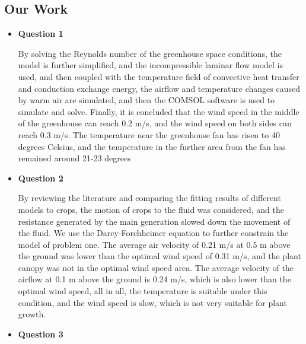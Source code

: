 \documentclass{apmcmthesis}
\begin{document}
\subsection{Our Work}
\begin{itemize}
  \item \textbf{Question 1}

  By solving the Reynolds number of the greenhouse space conditions, the model is further simplified, and the incompressible laminar flow model is used, and then coupled with the temperature field of convective heat transfer and conduction exchange energy, the airflow and temperature changes caused by warm air are simulated, and then the COMSOL software is used to simulate and solve. Finally, it is concluded that the wind speed in the middle of the greenhouse can reach 0.2 m/s, and the wind speed on both sides can reach 0.3 m/s. The temperature near the greenhouse fan has risen to 40 degrees Celsius, and the temperature in the further area from the fan has remained around 21-23 degrees
  \item \textbf{Question 2}
  
   By reviewing the literature and comparing the fitting results of different models to crops, the motion of crops to the fluid was considered, and the resistance generated by the main generation slowed down the movement of the fluid. We use the Darcy-Forchheimer equation to further constrain the model of problem one. The average air velocity of 0.21 m/s at 0.5 m above the ground was lower than the optimal wind speed of 0.31 m/s, and the plant canopy was not in the optimal wind speed area. The average velocity of the airflow at 0.1 m above the ground is 0.24 m/s, which is also lower than the optimal wind speed, all in all, the temperature is suitable under this condition, and the wind speed is slow, which is not very suitable for plant growth.
  \item \textbf{Question 3}


\end{itemize}
\end{document}
